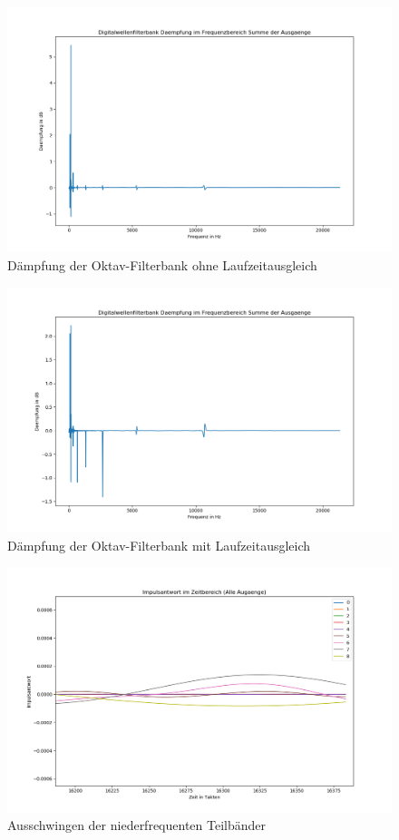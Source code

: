 \begin{figure}[h!]
	\centering	\includegraphics[width=14cm]{img/bank_freq_summe_keinAusgleich.png}
	\caption{Dämpfung der Oktav-Filterbank ohne Laufzeitausgleich}
	\label{fig:AusgangDeampfungohneAusgleich}
\end{figure}
\begin{figure}[h!]
	\centering	\includegraphics[width=14cm]{img/bank_freq_summe.png}
	\caption{Dämpfung der Oktav-Filterbank mit Laufzeitausgleich}
	\label{fig:AusgangDeampfung}
\end{figure}
\begin{figure}[h!]
	\centering	\includegraphics[width=14cm]{img/bank_zeit_alle_ausschwingen.png}
	\caption{Ausschwingen der niederfrequenten Teilbänder}
	\label{fig:Ausschwingen}
\end{figure}

\FloatBarrier